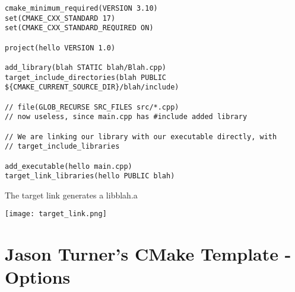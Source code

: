 \begin{verbatim}
cmake_minimum_required(VERSION 3.10)
set(CMAKE_CXX_STANDARD 17)
set(CMAKE_CXX_STANDARD_REQUIRED ON)

project(hello VERSION 1.0)

add_library(blah STATIC blah/Blah.cpp)
target_include_directories(blah PUBLIC ${CMAKE_CURRENT_SOURCE_DIR}/blah/include)

// file(GLOB_RECURSE SRC_FILES src/*.cpp)
// now useless, since main.cpp has #include added library

// We are linking our library with our executable directly, with
// target_include_libraries

add_executable(hello main.cpp)
target_link_libraries(hello PUBLIC blah)
\end{verbatim}

The target link generates a libblah.a

\begin{center}
    \texttt{[image: target\_link.png]}
\end{center}

\section{Jason Turner's CMake Template - Options}

